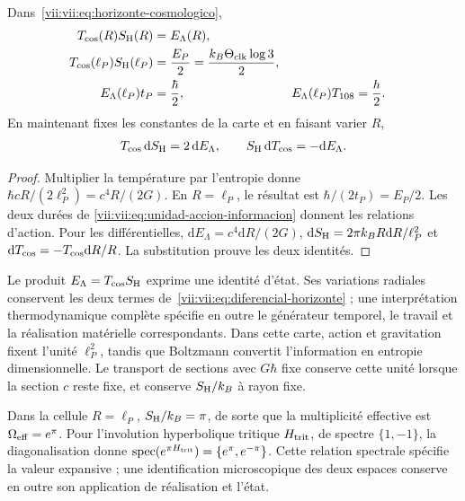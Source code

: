 \begin{theorem}
\label{vii:vii:thm:celda-media-accion}
Dans~\eqref{vii:vii:eq:horizonte-cosmologico},
\begin{align}
 T_{\rm cos}(R)S_{\rm H}(R)&=E_\Lambda(R),\\
 T_{\rm cos}(\ell_P)S_{\rm H}(\ell_P)
 &=\frac{E_P}{2}=\frac{k_B\Theta_{\rm clk}\log3}{2},\\
 E_\Lambda(\ell_P)t_P&=\frac{\hbar}{2},&
 E_\Lambda(\ell_P)T_{108}&=\frac h2.
 \label{vii:vii:eq:media-accion-horizonte}
\end{align}
En maintenant fixes les constantes de la carte et en faisant varier \(R\),
\begin{equation}
 T_{\rm cos}\,\mathrm dS_{\rm H}=2\,\mathrm dE_\Lambda,
 \qquad S_{\rm H}\,\mathrm dT_{\rm cos}=-\mathrm dE_\Lambda.
 \label{vii:vii:eq:diferencial-horizonte}
\end{equation}
\end{theorem}
\begin{proof}
Multiplier la température par l'entropie donne
\(\hbar cR/(2\ell_P^2)=c^4R/(2G)\).
En \(R=\ell_P\), le résultat est
\(\hbar/(2t_P)=E_P/2\). Les deux durées de
\eqref{vii:vii:eq:unidad-accion-informacion} donnent les relations d'action.
Pour les différentielles,
\(\mathrm dE_\Lambda=c^4\mathrm dR/(2G)\),
\(\mathrm dS_{\rm H}=2\pi k_BR\mathrm dR/\ell_P^2\) et
\(\mathrm dT_{\rm cos}=-T_{\rm cos}\mathrm dR/R\).
La substitution prouve les deux identités.
\end{proof}

Le produit \(E_\Lambda=T_{\rm cos}S_{\rm H}\) exprime une identité d'état. Ses variations radiales conservent les deux termes de~\eqref{vii:vii:eq:diferencial-horizonte} ; une interprétation thermodynamique complète spécifie en outre le générateur temporel, le travail et la réalisation matérielle correspondants. Dans cette carte, action et gravitation fixent l'unité \(\ell_P^2\), tandis que Boltzmann convertit l'information en entropie dimensionnelle. Le transport de sections avec \(G\hbar\) fixe conserve cette unité lorsque la section \(c\) reste fixe, et conserve \(S_{\rm H}/k_B\) à rayon fixe.

Dans la cellule \(R=\ell_P\), \(S_{\rm H}/k_B=\pi\), de sorte que
la multiplicité effective est \(\Omega_{\rm eff}=e^\pi\).
Pour l'involution hyperbolique tritique \(H_{\rm trit}\), de spectre
\(\{1,-1\}\), la diagonalisation donne
\(\operatorname{spec}(e^{\pi H_{\rm trit}})=\{e^\pi,e^{-\pi}\}\).
Cette relation spectrale spécifie la valeur expansive ; une identification
microscopique des deux espaces conserve en outre son application de
réalisation et l'état.


